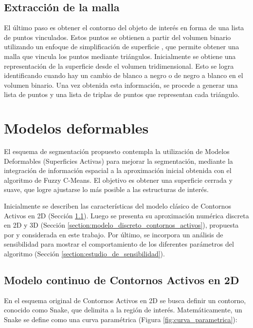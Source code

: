 \subsection{Extracción de la malla}
El último paso es obtener el contorno del objeto de interés en forma de una lista de puntos vinculados. Estos puntos se obtienen a partir del volumen binario utilizando un enfoque de simplificación de superficie \citep{fang2009tetrahedral}, que permite obtener una malla que vincula los puntos mediante triángulos. Inicialmente se obtiene una representación de la superficie desde el volumen tridimensional. Esto se logra identificando cuando hay un cambio de blanco a negro o de negro a blanco en el volumen binario. Una vez obtenida esta información, se procede a generar una lista de puntos y una lista de triplas de puntos que representan cada triángulo.


\section{Modelos deformables}\label{section:modelos_deformables}
El esquema de segmentación propuesto contempla la utilización de Modelos Deformables (Superficies Activas) para mejorar la segmentación, mediante la integración de información espacial a la aproximación inicial obtenida con el algoritmo de Fuzzy C-Means. El objetivo es obtener una superficie cerrada y suave, que logre ajustarse lo más posible a las estructuras de interés.

Inicialmente se describen las características del modelo clásico de Contornos Activos en 2D \citep{kass1988snakes} (Sección \ref{section:modelo_continuo_contornos_activos}). Luego se presenta su aproximación numérica discreta en 2D y 3D (Sección \ref{section:modelo_discreto_contornos_activos}), propuesta por \cite{mcinerney2000t} y considerada en este trabajo. Por último, se incorpora un análisis de sensibilidad para mostrar el comportamiento de los diferentes parámetros del algoritmo (Sección \ref{section:estudio_de_sensibilidad}).

\subsection{Modelo continuo de Contornos Activos en 2D}\label{section:modelo_continuo_contornos_activos}

En el esquema original de Contornos Activos en 2D se busca definir un contorno, conocido como Snake, que delimita a la región de interés. Matemáticamente, un Snake se define como una curva paramétrica (Figura \ref{fig:curva_parametrica}):

